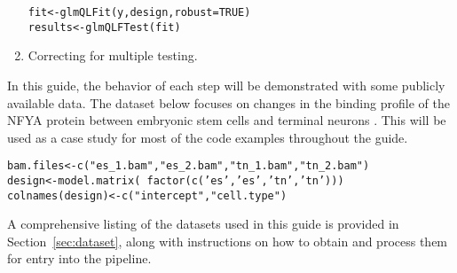 \documentclass{report}\usepackage[]{graphicx}\usepackage[usenames,dvipsnames]{color}
\newcommand{\hlnum}[1]{\textcolor[rgb]{0.816,0.125,0.439}{#1}}%
\newcommand{\hlstr}[1]{\textcolor[rgb]{0.251,0.627,0.251}{#1}}%
\newcommand{\hlopt}[1]{\textcolor[rgb]{0,0,0}{#1}}%
\newcommand{\hlstd}[1]{\textcolor[rgb]{0.251,0.251,0.251}{#1}}%
\newcommand{\hlkwb}[1]{\textcolor[rgb]{0,0,0}{#1}}%
\newcommand{\hlkwc}[1]{\textcolor[rgb]{0.251,0.251,0.251}{#1}}%
\newcommand{\hlkwd}[1]{\textcolor[rgb]{0.878,0.439,0.125}{#1}}%
\newenvironment{knitrout}{}{} %
\begin{document}
\begin{enumerate}
\begin{knitrout}
\begin{kframe}
\begin{alltt}
\hlstd{fit} \hlkwb{<-} \hlkwd{glmQLFit}\hlstd{(y, design,} \hlkwc{robust}\hlstd{=}\hlnum{TRUE}\hlstd{)}
\hlstd{results} \hlkwb{<-} \hlkwd{glmQLFTest}\hlstd{(fit)}
\end{alltt}
\end{kframe}
\end{knitrout}
\item Correcting for multiple testing.
\begin{knitrout}
\color{fgcolor}
\end{knitrout}
\end{enumerate}

In this guide, the behavior of each step will be demonstrated with some publicly available data.
The dataset below focuses on changes in the binding profile of the NFYA protein between embryonic stem cells and terminal neurons \cite{tiwari2012}. 
This will be used as a case study for most of the code examples throughout the guide.

\begin{knitrout}
\color{fgcolor}\begin{kframe}
\begin{alltt}
\hlstd{bam.files} \hlkwb{<-} \hlkwd{c}\hlstd{(}\hlstr{"es_1.bam"}\hlstd{,} \hlstr{"es_2.bam"}\hlstd{,} \hlstr{"tn_1.bam"}\hlstd{,} \hlstr{"tn_2.bam"}\hlstd{)}
\hlstd{design} \hlkwb{<-} \hlkwd{model.matrix}\hlstd{(}\hlopt{~}\hlkwd{factor}\hlstd{(}\hlkwd{c}\hlstd{(}\hlstr{'es'}\hlstd{,} \hlstr{'es'}\hlstd{,} \hlstr{'tn'}\hlstd{,} \hlstr{'tn'}\hlstd{)))}
\hlkwd{colnames}\hlstd{(design)} \hlkwb{<-} \hlkwd{c}\hlstd{(}\hlstr{"intercept"}\hlstd{,} \hlstr{"cell.type"}\hlstd{)}
\end{alltt}
\end{kframe}
\end{knitrout}
\label{data:main}

A comprehensive listing of the datasets used in this guide is provided in Section~\ref{sec:dataset}, along with instructions on how to obtain and process them for entry into the  pipeline.
\end{document}
